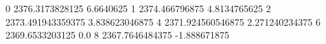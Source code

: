 0 2376.3173828125 6.6640625
1 2374.466796875 4.8134765625
2 2373.491943359375 3.838623046875
4 2371.924560546875 2.271240234375
6 2369.6533203125 0.0
8 2367.7646484375 -1.888671875
